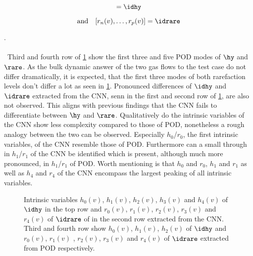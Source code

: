 \begin{minipage}{0.45\textwidth}
	\begin{equation}
	[h_1(v),\dots,h_p(v)] = \idhy
	\end{equation}
\end{minipage}%
\begin{minipage}{0.45\textwidth}
	\begin{equation}
	\mathrm{and}\quad[r_n(v),\dots,r_p(v)] = \idrare
	\end{equation}
\end{minipage}.\\\\\
Third and fourth row of \cref{Fig: CNNPOD} show the first three and five POD modes of \(\hy\) and \(\rare\). As the bulk dynamic answer of the two gas flows to the test case do not differ dramatically, it is expected, that the first three modes of both rarefaction levels don't differ a lot as seen in \cref{Fig: CNNPOD}. Pronounced differences of \(\idhy\) and \(\idrare\) extracted from the CNN, senn in the first and second row of \cref{Fig: CNNPOD}, are also not observed. This aligns with previous findings that the CNN fails to differentiate between \(\hy\) and \(\rare\). Qualitatively do the intrinsic variables of the CNN show less complexity compared to those of POD, nonetheless a rough analogy between the two can be observed. Especially \(h_0\)/\(r_0\), the first intrinsic variables, of the CNN resemble those of POD. Furthermore can a small through in \(h_1\)/\(r_1\) of the CNN be identified which is present, although much more pronounced, in \(h_1\)/\(r_1\) of POD. Worth mentioning is that \(h_0\) and \(r_0\), \(h_1\) and \(r_1\) as well as \(h_4\) and \(r_4\) of the CNN encompass the largest peaking of all intrinsic variables.\\    
\begin{figure}[hp!]
	
	\caption{Intrinsic variables \(h_0(v)\), \(h_1(v)\), \(h_2(v)\), \(h_3(v)\) and \(h_4(v)\) of \(\idhy\) in the top row and \(r_0(v)\), \(r_1(v)\), \(r_2(v)\), \(r_3(v)\) and \(r_4(v)\) of \(\idrare\) of in the second row extracted from the CNN. Third and fourth row show \(h_0(v)\), \(h_1(v)\), \(h_2(v)\) of \(\idhy\) and \(r_0(v)\), \(r_1(v)\) , \(r_2(v)\), \(r_3(v)\) and \(r_4(v)\) of \(\idrare\) extracted from POD respectively.}
	\label{Fig: CNNPOD}
\end{figure}

